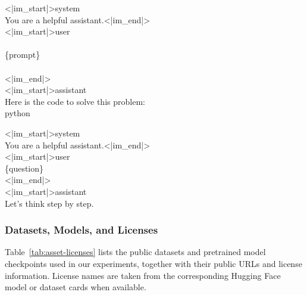 \begin{table}[h]
\begin{minipage}[t]{0.48\textwidth}
\centering
\caption{Chat template for \alg{} MBPP evaluation.}
\begin{chatbox}
    <|im\_start|>system\\
    You are a helpful assistant.<|im\_end|>\\
    <|im\_start|>user\\
    \textasciigrave\textasciigrave\textasciigrave\\
    \{{prompt}\}\\
    \textasciigrave\textasciigrave\textasciigrave\\
    <|im\_end|>\\
    <|im\_start|>assistant\\
    Here is the code to solve this problem:\\
    \textasciigrave\textasciigrave\textasciigrave python
\end{chatbox}
\label{tab:chat-mbpp}
\end{minipage}
\hfill
\begin{minipage}[t]{0.48\textwidth}
\centering
\caption{Chat template for VLP GSM8K evaluation.}
\begin{chatbox}
    <|im\_start|>system\\
    You are a helpful assistant.<|im\_end|>\\
    <|im\_start|>user\\
    \{{question}\}\\
    <|im\_end|>\\
    <|im\_start|>assistant\\
    Let's think step by step.
\end{chatbox}
\label{tab:chat-gsm8k}
\end{minipage}
\end{table}


\subsubsection{Datasets, Models, and Licenses}\label{sec:asset-licenses}

Table~\ref{tab:asset-licenses} lists the public datasets and pretrained model checkpoints used in our experiments, together with their public URLs and license information. License names are taken from the corresponding Hugging Face model or dataset cards when available.

